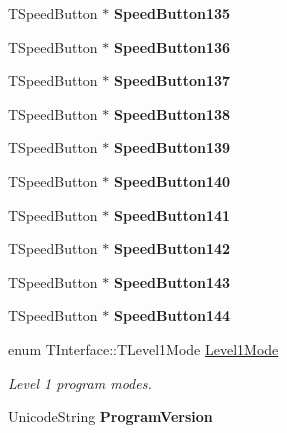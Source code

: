 \begin{DoxyCompactItemize}
\mbox{\label{class_t_interface_ac20683f203b12a097b2370f83d2f3a3e}} 
T\+Speed\+Button $\ast$ {\bfseries Speed\+Button135}
\item 
\mbox{\label{class_t_interface_ac44e61a8389fb10e4bb23d29b5af81f2}} 
T\+Speed\+Button $\ast$ {\bfseries Speed\+Button136}
\item 
\mbox{\label{class_t_interface_ac662a5df38a15061942453e9b63aac4c}} 
T\+Speed\+Button $\ast$ {\bfseries Speed\+Button137}
\item 
\mbox{\label{class_t_interface_ac485ed2a5a597d527e91eb668b9854c5}} 
T\+Speed\+Button $\ast$ {\bfseries Speed\+Button138}
\item 
\mbox{\label{class_t_interface_aac255250a01aa6e81ef1c666ccdd55ef}} 
T\+Speed\+Button $\ast$ {\bfseries Speed\+Button139}
\item 
\mbox{\label{class_t_interface_a6e1d3e414e9479645a9ce3dc19b77c69}} 
T\+Speed\+Button $\ast$ {\bfseries Speed\+Button140}
\item 
\mbox{\label{class_t_interface_abda1efdc985768dba3dc7b3ff2f9fada}} 
T\+Speed\+Button $\ast$ {\bfseries Speed\+Button141}
\item 
\mbox{\label{class_t_interface_af3b8507dfb89ba79fe353342e79f73bb}} 
T\+Speed\+Button $\ast$ {\bfseries Speed\+Button142}
\item 
\mbox{\label{class_t_interface_a81be9a2f24c16fcddd636cb65416f32f}} 
T\+Speed\+Button $\ast$ {\bfseries Speed\+Button143}
\item 
\mbox{\label{class_t_interface_a67212c07e268f5a78ee5a4fcfe8eaca5}} 
T\+Speed\+Button $\ast$ {\bfseries Speed\+Button144}
\item 
\mbox{\label{class_t_interface_a4144280e4a8af28178c7949976fc67bd}} 
enum T\+Interface\+::\+T\+Level1\+Mode \mbox{\hyperlink{class_t_interface_a4144280e4a8af28178c7949976fc67bd}{Level1\+Mode}}
\begin{DoxyCompactList}\small\item\em Level 1 program modes. \end{DoxyCompactList}\item 
\mbox{\label{class_t_interface_a83d8b6f4fbf587f117e4e166259190d4}} 
Unicode\+String {\bfseries Program\+Version}
\end{DoxyCompactItemize}
